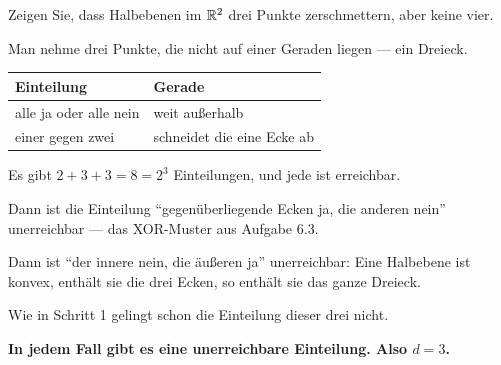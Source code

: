 \begin{aufgabe}
Zeigen Sie, dass Halbebenen im $\mathbb{R}^{2}$ drei Punkte zerschmettern, aber keine vier.

\loesung
{}
Man nehme drei Punkte, die nicht auf einer Geraden liegen --- ein Dreieck.

\begin{center}
{\small
\renewcommand{\arraystretch}{1.5}
\begin{tabular}{@{}P{3.4cm}P{5.0cm}@{}}
\toprule
\textbf{Einteilung} & \textbf{Gerade}\\
\midrule
alle ja oder alle nein & weit außerhalb\\
einer gegen zwei & schneidet die eine Ecke ab\\
\bottomrule
\end{tabular}}
\end{center}

Es gibt $2 + 3 + 3 = 8 = 2^{3}$ Einteilungen, und jede ist erreichbar. \checkmark

\begin{center}
\begin{minipage}{0.86\textwidth}
\end{minipage}
\end{center}

 Dann ist die Einteilung \enquote{gegenüberliegende Ecken ja, die anderen nein} unerreichbar --- das XOR-Muster aus Aufgabe 6.3.

 Dann ist \enquote{der innere nein, die äußeren ja} unerreichbar: Eine Halbebene ist konvex, enthält sie die drei Ecken, so enthält sie das ganze Dreieck.

 Wie in Schritt 1 gelingt schon die Einteilung dieser drei nicht.

\begin{center}
\begin{minipage}{0.9\textwidth}
\textbf{In jedem Fall gibt es eine unerreichbare Einteilung. Also $d = 3$.}
\end{minipage}
\end{center}


\end{aufgabe}
